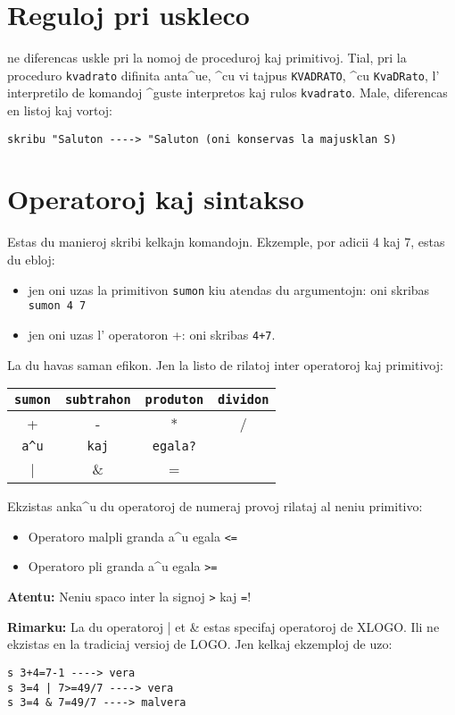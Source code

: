 \section{Reguloj pri uskleco}

\xlogo{} ne diferencas uskle pri la nomoj de proceduroj kaj
primitivoj.  Tial, pri la proceduro \texttt{kvadrato} difinita
anta^ue, ^cu vi tajpus \texttt{KVADRATO}, ^cu \texttt{KvaDRato}, l'
interpretilo de komandoj ^guste interpretos kaj rulos
\texttt{kvadrato}.  Male, \xlogo{} diferencas en listoj kaj vortoj:
\begin{verbatim}
skribu "Saluton ----> "Saluton (oni konservas la majusklan S)
\end{verbatim}
\section{Operatoroj kaj sintakso}
Estas du manieroj skribi kelkajn komandojn.  Ekzemple, por adicii 4
kaj 7, estas du ebloj:
\begin{itemize}
\item jen oni uzas la primitivon \texttt{sumon} kiu atendas du
  argumentojn: oni skribas \texttt{sumon 4 7 }
\item jen oni uzas l' operatoron +: oni skribas \texttt{4+7}.
\end{itemize}
La du havas saman efikon.  Jen la listo de rilatoj inter operatoroj
kaj primitivoj:
\begin{center}
  \begin{tabular}{|c|c|c|c|}
    \hline
    \texttt{sumon} & \texttt{subtrahon} & \texttt{produton} & \texttt{dividon}\\
    \hline
    + & - & * & / \\
    \hline
    \texttt{a^u} & \texttt{kaj}&\texttt{egala?}& \\
    \hline
    | & \& &=&\\
    \hline
  \end{tabular}\end{center}
\vspace{0.25cm}
Ekzistas anka^u du operatoroj de numeraj provoj rilataj al neniu primitivo:
\begin{itemize}
\item Operatoro \og malpli granda a^u egala\fg{} \texttt{<=}
\item Operatoro \og pli granda a^u egala\fg{} \texttt{>=}
\end{itemize}

\textbf{Atentu:} Neniu spaco inter la signoj \verb+>+ kaj \verb+=+!

\textbf{Rimarku:} La du operatoroj | et \& estas specifaj operatoroj
de XLOGO.  Ili ne ekzistas en la tradiciaj versioj de LOGO.  Jen
kelkaj ekzemploj de uzo:
\begin{verbatim}
s 3+4=7-1 ----> vera
s 3=4 | 7>=49/7 ----> vera
s 3=4 & 7=49/7 ----> malvera
\end{verbatim}
